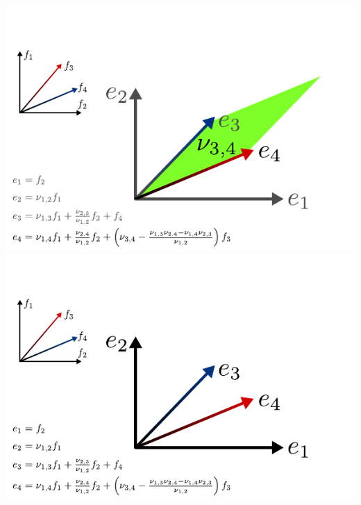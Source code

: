 \documentclass[compress]{beamer}
\begin{document}
\begin{frame}
\begin{center}
\begin{overprint}
      \includegraphics[scale=1.0]{../img/recursionformula/13.pdf}
      \includegraphics[scale=1.0]{../img/recursionformula/14.pdf}
    \end{overprint}
  \end{center}
\end{frame}

\blankframe{}
\end{document}
